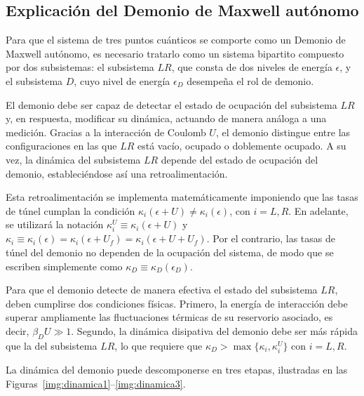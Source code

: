 \label{sec5:modelo}


\subsection{Explicación del Demonio de Maxwell autónomo}
\label{explicaciondem}
Para que el sistema de tres puntos cuánticos se comporte como un Demonio de Maxwell autónomo, es necesario tratarlo como un sistema bipartito compuesto por dos subsistemas: el subsistema $LR$, que consta de dos niveles de energía $\epsilon$, y el subsistema $D$, cuyo nivel de energía $\epsilon_D$ desempeña el rol de demonio.

El demonio debe ser capaz de detectar el estado de ocupación del subsistema $LR$ y, en respuesta, modificar su dinámica, actuando de manera análoga a una medición. Gracias a la interacción de Coulomb $U$, el demonio distingue entre las configuraciones en las que $LR$ está vacío, ocupado o doblemente ocupado. A su vez, la dinámica del subsistema $LR$ depende del estado de ocupación del demonio, estableciéndose así una retroalimentación.

Esta retroalimentación se implementa matemáticamente imponiendo que las tasas de túnel cumplan la condición $\kappa_{i}(\epsilon + U) \neq \kappa_{i}(\epsilon)$, con $i = L, R$. En adelante, se utilizará la notación $\kappa^{U}_{i} \equiv \kappa_{i}(\epsilon+U)$ y $\kappa_{i} \equiv \kappa_{i}(\epsilon)=\kappa_{i}(\epsilon+U_{f})=\kappa_{i}(\epsilon+U+U_{f})$. Por el contrario, las tasas de túnel del demonio no dependen de la ocupación del sistema, de modo que se escriben simplemente como $\kappa_{D}\equiv \kappa_{D}(\epsilon_D)$.

Para que el demonio detecte de manera efectiva el estado del subsistema $LR$, deben cumplirse dos condiciones físicas. Primero, la energía de interacción debe superar ampliamente las fluctuaciones térmicas de su reservorio asociado, es decir, $\beta_{D} U \gg 1$. Segundo, la dinámica disipativa del demonio debe ser más rápida que la del subsistema $LR$, lo que requiere que $\kappa_{D} > \max\{\kappa_{i}, \kappa^{U}_{i}\}$ con $i = L, R$.

La dinámica del demonio puede descomponerse en tres etapas, ilustradas en las Figuras~\ref{img:dinamica1}–\ref{img:dinamica3}.  


